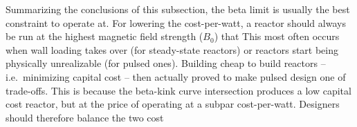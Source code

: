 Summarizing the conclusions of this subsection, the beta limit is usually the best constraint to operate at. For lowering the cost-per-watt, a reactor should always be run at the highest magnetic field strength ($B_0$) that  This most often occurs when wall loading takes over (for steady-state reactors) or reactors start being physically unrealizable (for pulsed ones). Building cheap to build reactors -- i.e.\ minimizing capital cost -- then actually proved to make pulsed design one of trade-offs. This is because the beta-kink curve intersection produces a low capital cost reactor, but at the price of operating at a subpar cost-per-watt. Designers should therefore balance the two cost 

\clearpage

\newpage

